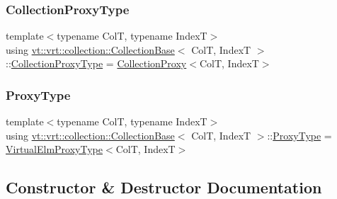 \subsubsection{\texorpdfstring{Collection\+Proxy\+Type}{CollectionProxyType}}
{\footnotesize\ttfamily template$<$typename ColT, typename IndexT$>$ \\
using \hyperlink{structvt_1_1vrt_1_1collection_1_1_collection_base}{vt\+::vrt\+::collection\+::\+Collection\+Base}$<$ ColT, IndexT $>$\+::\hyperlink{structvt_1_1vrt_1_1collection_1_1_collection_base_af40b40a2ee128748bcb917f14a0152b4}{Collection\+Proxy\+Type} =  \hyperlink{structvt_1_1vrt_1_1collection_1_1_collection_proxy}{Collection\+Proxy}$<$ColT, IndexT$>$}

\mbox{\label{structvt_1_1vrt_1_1collection_1_1_collection_base_a0c2fd2443732bebc963f6278b7ba089b}} 
\subsubsection{\texorpdfstring{Proxy\+Type}{ProxyType}}
{\footnotesize\ttfamily template$<$typename ColT, typename IndexT$>$ \\
using \hyperlink{structvt_1_1vrt_1_1collection_1_1_collection_base}{vt\+::vrt\+::collection\+::\+Collection\+Base}$<$ ColT, IndexT $>$\+::\hyperlink{structvt_1_1vrt_1_1collection_1_1_collection_base_a0c2fd2443732bebc963f6278b7ba089b}{Proxy\+Type} =  \hyperlink{namespacevt_1_1vrt_a620a5c8c59d13e513f690c74b4af516f}{Virtual\+Elm\+Proxy\+Type}$<$ColT, IndexT$>$}



\subsection{Constructor \& Destructor Documentation}
\mbox{\label{structvt_1_1vrt_1_1collection_1_1_collection_base_ab2134eca144d6b2703fffb12c71d9f9b}} 
